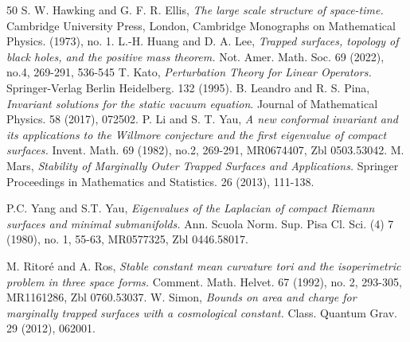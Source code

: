 \documentclass[a4paper, 11pt, reqno]{amsart}
\begin{document}
\begin{thebibliography}{50}
 S. W. Hawking and G. F. R. Ellis, {\it The large scale structure of space-time.} Cambridge University Press, London, Cambridge Monographs on Mathematical Physics. (1973), no. 1.
 L.-H. Huang and D. A. Lee, {\it Trapped surfaces, topology of black holes, and the positive mass theorem.} Not. Amer. Math. Soc. 69 (2022),  no.4, 269-291,  536-545
 T. Kato, {\it Perturbation Theory for Linear Operators.} Springer-Verlag Berlin Heidelberg. 132 (1995).
 B. Leandro and R. S. Pina, {\it Invariant solutions for the static vacuum equation}. Journal of Mathematical Physics. 58 (2017), 072502.
 P. Li and S. T. Yau, {\it A new conformal invariant and its applications to the
Willmore conjecture and the first eigenvalue of compact surfaces.} Invent. Math. 69 (1982),  no.2, 269-291, MR0674407, Zbl 0503.53042.
 M. Mars, {\it Stability of Marginally Outer Trapped Surfaces
and Applications.} Springer Proceedings in Mathematics and Statistics. 26 (2013), 111-138.

 P.C. Yang and S.T. Yau, {\it Eigenvalues of the Laplacian of compact Riemann
surfaces and minimal submanifolds.} Ann. Scuola Norm. Sup. Pisa Cl. Sci. (4) 7
(1980), no. 1, 55-63, MR0577325, Zbl 0446.58017.

 M. Ritor\'e and A. Ros, {\it Stable constant mean curvature tori and the isoperimetric
problem in three space forms.} Comment. Math. Helvet. 67 (1992), no. 2, 293-305, MR1161286, Zbl 0760.53037.
 W. Simon, {\it Bounds on area and charge for marginally trapped surfaces with a cosmological
constant.} Class. Quantum Grav. 29 (2012), 062001.

\end{thebibliography}
\end{document}
